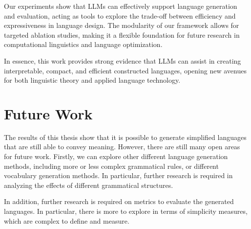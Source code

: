 Our experiments show that LLMs can effectively support language generation and evaluation, acting as tools to explore the trade-off between efficiency and expressiveness in language design. 
The modularity of our framework allows for targeted ablation studies, making it a flexible foundation for future research in computational linguistics and language optimization.

In essence, this work provides strong evidence that LLMs can assist in creating interpretable, compact, and efficient constructed languages, 
opening new avenues for both linguistic theory and applied language technology.


\section{Future Work}
The results of this thesis show that it is possible to generate simplified languages that are still able to convey meaning. However, there are still many
open areas for future work. Firstly, we can explore other different language generation methods, including more or less complex grammatical rules,
or different vocabulary generation methods. In particular, further research is required in analyzing the effects of different grammatical structures.

In addition, further research is required on metrics to evaluate the generated languages. In particular, there is more to explore
in terms of simplicity measures, which are complex to define and measure.
